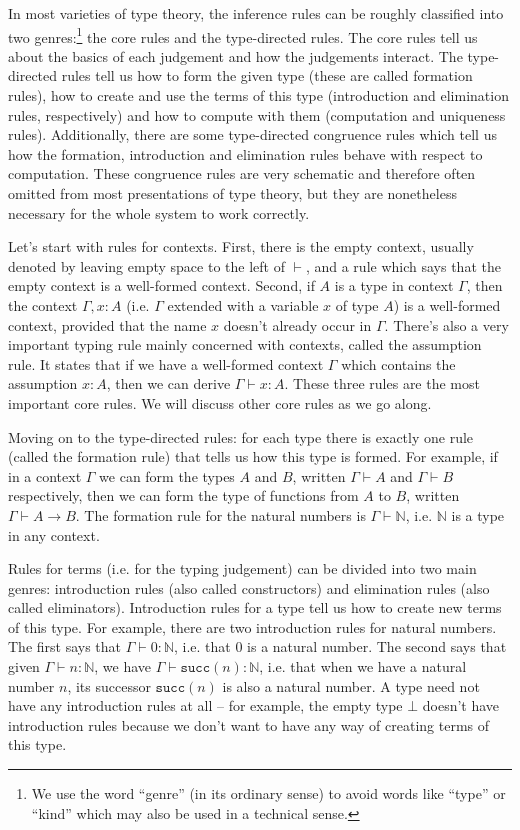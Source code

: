 \documentclass[declaration,mgr,english,shortabstract]{iithesis}
\newcommand{\m}[1]{\texttt{#1}}
\newcommand{\type}[2]{#1 \vdash #2}
\newcommand{\term}[3]{#1 \vdash #2 : #3}
\newcommand{\N}{\mathbb{N}}
\newcommand{\suc}[1]{\m{succ}(#1)}
\begin{document}
In most varieties of type theory, the inference rules can be roughly classified into two genres:\footnote{We use the word ``genre'' (in its ordinary sense) to avoid words like ``type'' or ``kind'' which may also be used in a technical sense.} the core rules and the type-directed rules. The core rules tell us about the basics of each judgement and how the judgements interact. The type-directed rules tell us how to form the given type (these are called formation rules), how to create and use the terms of this type (introduction and elimination rules, respectively) and how to compute with them (computation and uniqueness rules). Additionally, there are some type-directed congruence rules which tell us how the formation, introduction and elimination rules behave with respect to computation. These congruence rules are very schematic and therefore often omitted from most presentations of type theory, but they are nonetheless necessary for the whole system to work correctly.

Let's start with rules for contexts. First, there is the empty context, usually denoted by leaving empty space to the left of $\vdash$, and a rule which says that the empty context is a well-formed context. Second, if $A$ is a type in context $\Gamma$, then the context $\Gamma, x : A$ (i.e. $\Gamma$ extended with a variable $x$ of type $A$) is a well-formed context, provided that the name $x$ doesn't already occur in $\Gamma$. There's also a very important typing rule mainly concerned with contexts, called the assumption rule. It states that if we have a well-formed context $\Gamma$ which contains the assumption $x : A$, then we can derive $\term{\Gamma}{x}{A}$. These three rules are the most important core rules. We will discuss other core rules as we go along.

Moving on to the type-directed rules: for each type there is exactly one rule (called the formation rule) that tells us how this type is formed. For example, if in a context $\Gamma$ we can form the types $A$ and $B$, written $\type{\Gamma}{A}$ and $\type{\Gamma}{B}$ respectively, then we can form the type of functions from $A$ to $B$, written $\type{\Gamma}{A \to B}$. The formation rule for the natural numbers is $\type{\Gamma}{\N}$, i.e. $\N$ is a type in any context.

Rules for terms (i.e. for the typing judgement) can be divided into two main genres: introduction rules (also called constructors) and elimination rules (also called eliminators). Introduction rules for a type tell us how to create new terms of this type. For example, there are two introduction rules for natural numbers. The first says that $\term{\Gamma}{0}{\N}$, i.e. that $0$ is a natural number. The second says that given $\term{\Gamma}{n}{\N}$, we have $\term{\Gamma}{\suc{n}}{\N}$, i.e. that when we have a natural number $n$, its successor $\suc{n}$ is also a natural number. A type need not have any introduction rules at all -- for example, the empty type $\bot$ doesn't have introduction rules because we don't want to have any way of creating terms of this type.
\end{document}
